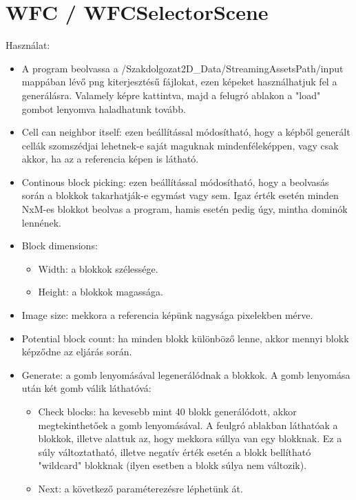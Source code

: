\section{WFC / WFCSelectorScene}
Használat:
\begin{itemize}
    \label{item:WFC-hasznalat}
        \item A program beolvassa a /Szakdolgozat2D\_Data/StreamingAssetsPath/input mappában lévő png kiterjesztésű fájlokat, ezen képeket használhatjuk fel a generálásra. Valamely képre kattintva, majd a felugró ablakon a "load" gombot lenyomva haladhatunk tovább.
        \item Cell can neighbor itself: ezen beállítással módosítható, hogy a képből generált cellák szomszédjai lehetnek-e saját maguknak mindenféleképpen, vagy csak akkor, ha az a referencia képen is látható.
        \item Continous block picking: ezen beállítással módosítható, hogy a beolvasás során a blokkok takarhatják-e egymást vagy sem. Igaz érték esetén minden NxM-es blokkot beolvas a program, hamis esetén pedig úgy, mintha dominók lennének.
        \item Block dimensions: 
        \begin{itemize}
            \item Width: a blokkok szélessége.
            \item Height: a blokkok magassága.
        \end{itemize}
        \item Image size: mekkora a referencia képünk nagysága pixelekben mérve.
        \item Potential block count: ha minden blokk különböző lenne, akkor mennyi blokk képződne az eljárás során.
        \item Generate: a gomb lenyomásával legenerálódnak a blokkok. A gomb lenyomása után két gomb válik láthatóvá:
        \begin{itemize}
            \item Check blocks: ha kevesebb mint 40 blokk generálódott, akkor megtekinthetőek a gomb lenyomásával.  A feulgró ablakban láthatóak a blokkok, illetve alattuk az, hogy mekkora súllya van egy blokknak. Ez a súly változtatható, illetve negatív érték esetén a blokk bellítható "wildcard" blokknak (ilyen esetben a blokk súlya nem változik).
            \item Next: a következő paraméterezésre léphetünk át.
        \end{itemize}
\end{itemize}

